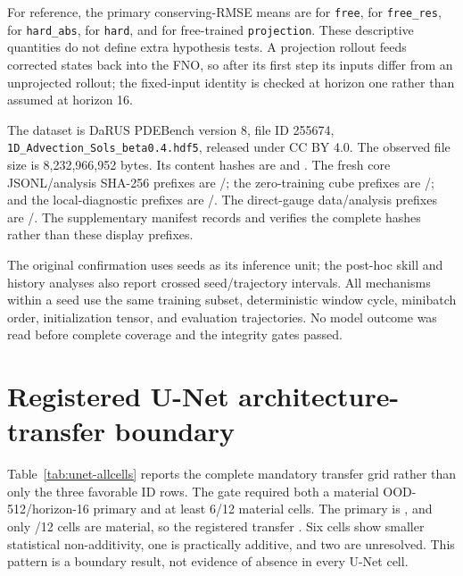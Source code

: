 \documentclass{article}
\begin{document}
For reference, the primary conserving-RMSE means are \FactorAZero{} for \texttt{free},
\FactorRZero{} for \texttt{free\_res}, \FactorAOne{} for \texttt{hard\_abs}, \FactorROne{} for
\texttt{hard}, and \FactorProjected{} for free-trained \texttt{projection}. These descriptive
quantities do not define extra hypothesis tests. A projection rollout feeds corrected states back
into the FNO, so after its first step its inputs differ from an unprojected rollout; the fixed-input
identity is checked at horizon one rather than assumed at horizon 16.

The dataset is DaRUS PDEBench version 8, file ID 255674,
\texttt{1D\_Advection\_Sols\_beta0.4.hdf5}, released under CC BY 4.0. The observed file size is
8,232,966,952 bytes. Its content hashes are
 and
.
The fresh core JSONL/analysis SHA-256 prefixes are
/; the zero-training cube prefixes are
/; and the local-diagnostic prefixes are
/. The direct-gauge data/analysis prefixes are
/. The supplementary manifest records and verifies the complete hashes rather
than these display prefixes.

The original confirmation uses seeds as its inference unit; the post-hoc skill and history
analyses also report crossed seed/trajectory intervals. All mechanisms within a seed use
the same training subset, deterministic window cycle, minibatch order, initialization tensor, and
evaluation trajectories. No model outcome was read before complete coverage and the integrity
gates passed.

\section{Registered U-Net architecture-transfer boundary}
\label{app:unet-artifacts}

Table~\ref{tab:unet-allcells} reports the complete mandatory transfer grid rather than only the
three favorable ID rows. The gate required both a material OOD-512/horizon-16 primary and at least
6/12 material cells. The primary is \emph{\UNetClassification}, and only
\UNetMaterialCells/12 cells are material, so the registered transfer \emph{\UNetAdmission}.
Six cells show smaller statistical non-additivity, one is practically additive, and two are
unresolved. This pattern is a boundary result, not evidence of absence in every U-Net cell.
\end{document}
